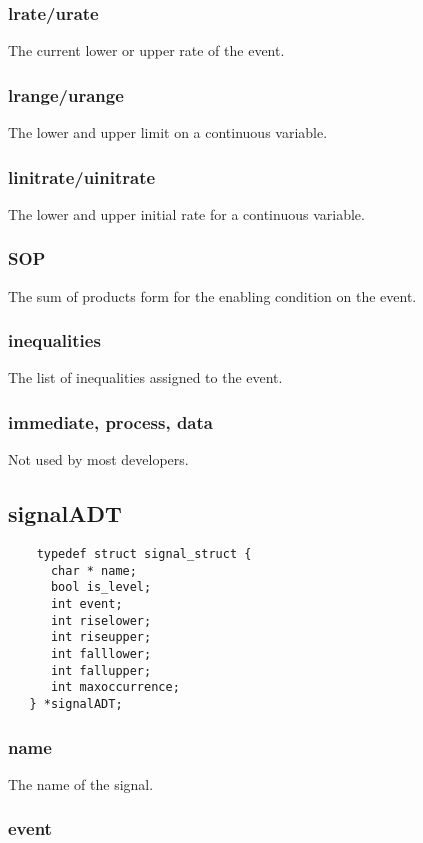 \documentclass[titlepage,11pt]{article}
\begin{document}
	\subsubsection{lrate/urate}
	The current lower or upper rate of the event.

	\subsubsection{lrange/urange}
	The lower and upper limit on a continuous variable.
	
	\subsubsection{linitrate/uinitrate}
	The lower and upper initial rate for a continuous variable.
	
	\subsubsection{SOP}
	The sum of products form for the enabling condition on the event.
	
	\subsubsection{inequalities}
	The list of inequalities assigned to the event.

  \subsubsection{immediate, process, data}
  Not used by most developers.

  \subsection{signalADT}
  \begin{verbatim}
    typedef struct signal_struct {
      char * name;
      bool is_level;
      int event;
      int riselower;
      int riseupper;
      int falllower;
      int fallupper;
      int maxoccurrence;
   } *signalADT;
  \end{verbatim}

  \subsubsection{name}
	The name of the signal.
	
	\subsubsection{event}
	
\end{document}
